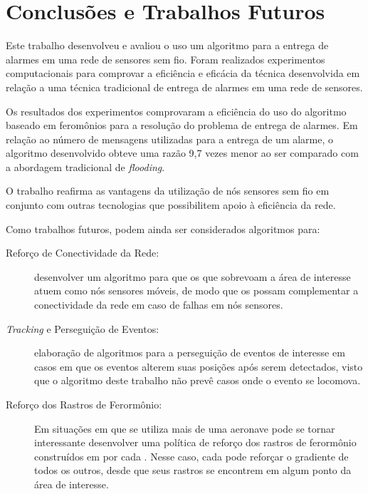 \newpage\section{Conclusões e Trabalhos Futuros}
\label{chap:Conclusões}

Este trabalho desenvolveu e avaliou o uso um algoritmo para a entrega de alarmes em uma rede de sensores sem fio. Foram realizados experimentos computacionais para comprovar a eficiência e eficácia da técnica desenvolvida em relação a uma técnica tradicional de entrega de alarmes em uma rede de sensores.

Os resultados dos experimentos comprovaram a eficiência do uso do algoritmo baseado em feromônios para a resolução do problema de entrega de alarmes. Em relação ao número de mensagens utilizadas para a entrega de um alarme, o algoritmo desenvolvido obteve uma razão 9,7 vezes menor ao ser comparado com a abordagem tradicional de \emph{flooding}.

O trabalho reafirma as vantagens da utilização de nós sensores sem fio em conjunto com outras tecnologias que possibilitem apoio à eficiência da rede.

Como trabalhos futuros, podem ainda ser considerados algoritmos para:

\begin{description}
	\item[Reforço de Conectividade da Rede:] desenvolver um algoritmo para que os \vants que sobrevoam a área de interesse atuem como nós sensores móveis, de modo que os \vants possam complementar a conectividade da rede em caso de falhas em nós sensores.
	
	\item[\emph{Tracking} e Perseguição de Eventos: ] elaboração de algoritmos para a perseguição de eventos de interesse em casos em que os eventos alterem suas posições após serem detectados, visto que o algoritmo deste trabalho não prevê casos onde o evento se locomova.

	\item[Reforço dos Rastros de Ferormônio:] Em situações em que se utiliza mais de uma aeronave pode se tornar interessante desenvolver uma política de reforço dos rastros de ferormônio construídos em por cada \vant. Nesse caso, cada \vant pode reforçar o gradiente de todos os outros, desde que seus rastros se encontrem em algum ponto da área de interesse.
\end{description}
\newpage
